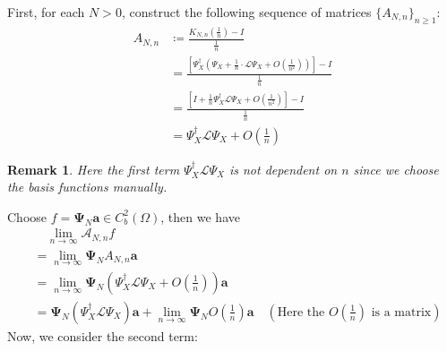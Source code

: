 \documentclass{article}[11]
\newtheorem*{remark}{Remark}
\begin{document}
	First, for each $N>0$, construct the following sequence of matrices $\{A_{N,n}\}_{n\geq 1}$:
	\begin{align*}
		A_{N,n} &\coloneqq \frac{ K_{N,n}\left( \tfrac{1}{n} \right)  - I }{\tfrac{1}{n}} \\
		&= \frac{ \left[\Psi_X^{\dagger}\left(\Psi_X + \tfrac{1}{n} \cdot \mathcal{L}\Psi_X + O(\tfrac{1}{n^2})\right)\right]  - I }{\tfrac{1}{n}} \\
		&= \frac{ \left[I + \tfrac{1}{n}\Psi_X^{\dagger}\mathcal{L}\Psi_X + O(\tfrac{1}{n^2})\right]  - I }{\tfrac{1}{n}} \\
		&= \Psi_X^{\dagger}\mathcal{L}\Psi_X + O(\tfrac{1}{n})
	\end{align*}
	\begin{remark}
		Here the first term $\Psi_X^{\dagger}\mathcal{L}\Psi_X$ is not dependent on $n$ since we choose the basis functions manually.
	\end{remark}
	Choose $f = \mathbf{\Psi}_N\mathbf{a} \in C_b^2(\Omega)$, then we have
	\begin{align*}
		&\quad \lim_{n\to\infty} \mathcal{A}_{N,n}f \\
		&= \lim_{n\to\infty} \mathbf{\Psi}_N A_{N,n}\mathbf{a} \\
		&= \lim_{n\to\infty} \mathbf{\Psi}_N\left(\Psi_X^{\dagger}\mathcal{L}\Psi_X + O(\tfrac{1}{n})\right)\mathbf{a} \\
		&= \mathbf{\Psi}_N\left(\Psi_X^{\dagger}\mathcal{L}\Psi_X\right)\mathbf{a} + \lim_{n\to\infty} \mathbf{\Psi}_N O(\tfrac{1}{n})\mathbf{a} \quad (\text{Here the $O(\tfrac{1}{n})$ is a matrix})
	\end{align*}
	Now, we consider the second term:
\end{document}
